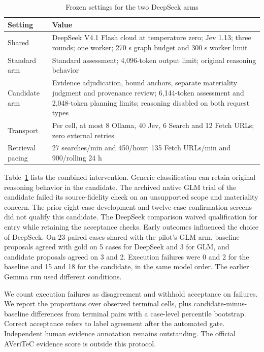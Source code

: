\documentclass[conference]{IEEEtran}
\begin{document}
\begin{table}[t]
\caption{Frozen settings for the two DeepSeek arms}
\label{tab:deepseek-settings}
\centering
\footnotesize
\begin{tabular}{@{}p{}p{}@{}}
\toprule
Setting & Value\\
\midrule
Shared & DeepSeek V4.1 Flash cloud at temperature zero; Jev 1.13; three rounds; one worker; 270 s graph budget and 300 s worker limit\\
Standard arm & Standard assessment; 4,096-token output limit; original reasoning behavior\\
Candidate arm & Evidence adjudication, bound anchors, separate materiality judgment and provenance review; 6,144-token assessment and 2,048-token planning limits; reasoning disabled on both request types\\
Transport & Per cell, at most 8 Ollama, 40 Jev, 6 Search and 12 Fetch URLs; zero external retries\\
Retrieval pacing & 27 searches/min and 450/hour; 135 Fetch URLs/min and 900/rolling 24 h\\
\bottomrule
\end{tabular}
\end{table}

Table~\ref{tab:deepseek-settings} lists the combined intervention. Generic classification can retain original reasoning behavior in the candidate. The archived native GLM trial of the candidate failed its source-fidelity check on an unsupported scope and materiality concern. The prior eight-case development and twelve-case confirmation screens did not qualify this candidate. The DeepSeek comparison waived qualification for entry while retaining the acceptance checks. Early outcomes influenced the choice of DeepSeek. On 23 paired cases shared with the pilot's GLM arm, baseline proposals agreed with gold on 5 cases for DeepSeek and 3 for GLM, and candidate proposals agreed on 3 and 2. Execution failures were 0 and 2 for the baseline and 15 and 18 for the candidate, in the same model order. The earlier Gemma run used different conditions.

We count execution failures as disagreement and withhold acceptance on failures. We report the proportions over observed terminal cells, plus candidate-minus-baseline differences from terminal pairs with a case-level percentile bootstrap. Correct acceptance refers to label agreement after the automated gate. Independent human evidence annotation remains outstanding. The official AVeriTeC evidence score is outside this protocol.
\end{document}
